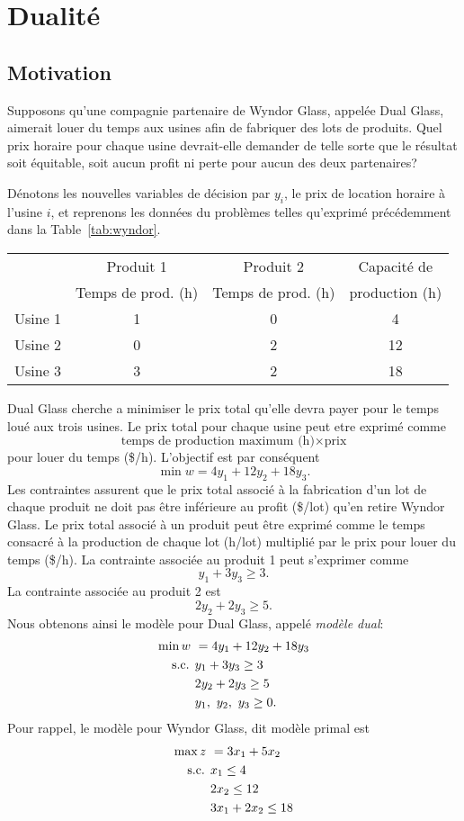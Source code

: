 \section{Dualité}

\subsection{Motivation}

\begin{example}
Supposons qu'une compagnie partenaire de Wyndor Glass, appelée Dual Glass, aimerait louer du temps aux usines afin de fabriquer des lots de produits.
Quel prix horaire pour chaque usine devrait-elle demander de telle sorte que le résultat soit équitable, soit aucun profit ni perte pour aucun des deux partenaires?

Dénotons les nouvelles variables de décision par $y_i$, le prix de location horaire à l'usine $i$, et reprenons les données du problèmes telles qu'exprimé précédemment dans la Table~\ref{tab:wyndor}.
\begin{center}
\begin{tabular}{|c|c|c|c|}
\hline
& Produit 1 & Produit 2 & Capacité de \\
& Temps de prod. (h) & Temps de prod. (h)& production (h)\\
\hline
Usine 1 & 1 & 0 & 4 \\
\hline
Usine 2 & 0 & 2 & 12 \\
\hline
Usine 3 & 3 & 2 & 18 \\
\hline
\end{tabular}
\end{center}
Dual Glass cherche a minimiser le prix total qu'elle devra payer pour le temps loué aux trois usines.
Le prix total pour chaque usine peut etre exprimé comme 
\[
\mbox{temps de production maximum (h)} \times \mbox{prix}
\]
pour louer du temps (\$/h).
L'objectif est par conséquent
\[
\min w = 4 y_1 + 12 y_2 + 18 y_3.
\]
Les contraintes assurent que le prix total associé à la fabrication d'un lot de chaque produit ne doit pas être inférieure au profit (\$/lot) qu'en retire Wyndor Glass.
Le prix total associé à un produit peut être exprimé comme le temps consacré à la production de chaque lot (h/lot) multiplié par le prix pour louer du temps (\$/h).
La contrainte associée au produit 1 peut s'exprimer comme
\[
y_1 + 3 y_3 \geq 3.
\]
La contrainte associée au produit 2 est
\[
2y_2 + 2 y_3 \geq 5.
\]
Nous obtenons ainsi le modèle pour Dual Glass, appelé {\sl modèle dual}:
\begin{align*}
\min w\ &= 4y_1 + 12y_2 + 18y_3 \\
\mbox{s.c. } & y_1 + 3y_3 \geq 3 \\
& 2y_2 + 2y_3 \geq 5 \\
& y_1,\ y_2,\ y_3 \geq 0.
\end{align*}
Pour rappel, le modèle pour Wyndor Glass, dit modèle primal est
\begin{align*}
\max z\ &= 3x_1 + 5x_2 \\
\mbox{s.c. } & x_1 \leq 4 \\
& 2x_2 \leq 12 \\
& 3x_1 + 2x_2 \leq 18
\end{align*}


\end{example}
